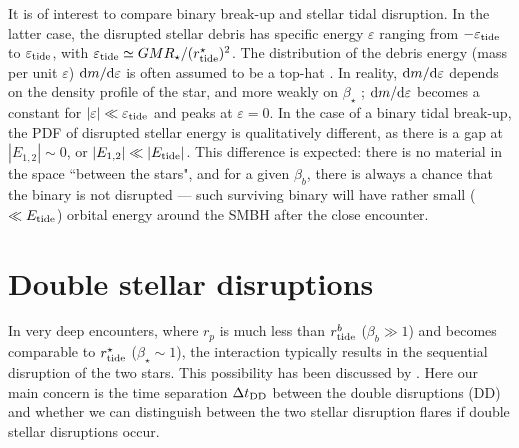 \documentclass[twocolumn]{aastex631}
\begin{document}
It is of interest to compare binary break-up and stellar tidal disruption. 
In the latter case, the disrupted stellar debris has specific energy $\varepsilon$ ranging from $-\varepsilon_{\rm tide}$ to $\varepsilon_{\rm tide}$, with $\varepsilon_{\rm tide} \simeq GMR_\star/(r_{\rm tide}^\star)^2$. 
The distribution of the debris energy (mass per unit $\varepsilon$) ${\rm d} m/{\rm d} \varepsilon$ is often assumed to be a top-hat \citep{Rees1988nature}. 
In reality, ${\rm d} m/{\rm d} \varepsilon$ depends on the density profile of the star, and more weakly on $\beta_\star$ \citep[e.g.,][]{Lodato2009MNRAS,Guillochon2013ApJ};
${\rm d} m/{\rm d} \varepsilon$ becomes a constant for $|\varepsilon| \ll \varepsilon_{\rm tide}$ and peaks at $\varepsilon = 0$. 
In the case of a binary tidal break-up, the PDF of disrupted stellar energy is qualitatively different, as there is a gap at $|E_{1,2}|\sim 0$, or $|E_{1,2}| \ll |E_{\rm tide}|$.
This difference is expected: there is no material in the space ``between the stars", and for a given $\beta_b$, there is always a chance that the binary is not disrupted --- such surviving binary will have rather small ($\ll E_{\rm tide}$) orbital energy around the SMBH after the close encounter.


\section{Double stellar disruptions}
\label{sec:double stellar disruption}

In very deep encounters, where $r_p$ is much less than $r_{\rm tide}^b$ ($\beta_b \gg 1$) and becomes comparable to $r_{\rm tide}^\star$ ($\beta_\star \sim 1$), the interaction typically results in the sequential disruption of the two stars. 
This possibility has been discussed by \citet{Mandel2015ApJL}. 
Here our main concern is the time separation $\Delta t_{\rm DD}$ between the double disruptions (DD) and whether we can distinguish between the two stellar disruption flares if double stellar disruptions occur.
\end{document}
